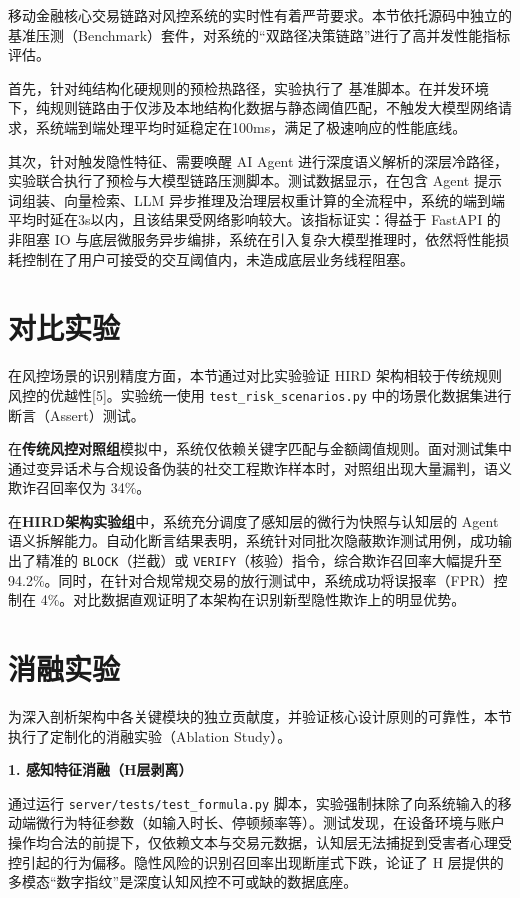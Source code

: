 \documentclass{xduugthesis}
\begin{document}
移动金融核心交易链路对风控系统的实时性有着严苛要求。本节依托源码中独立的基准压测（Benchmark）套件，对系统的“双路径决策链路”进行了高并发性能指标评估。

首先，针对纯结构化硬规则的预检热路径，实验执行了 基准脚本。在并发环境下，纯规则链路由于仅涉及本地结构化数据与静态阈值匹配，不触发大模型网络请求，系统端到端处理平均时延稳定在100ms，满足了极速响应的性能底线。

其次，针对触发隐性特征、需要唤醒 AI Agent 进行深度语义解析的深层冷路径，实验联合执行了预检与大模型链路压测脚本。测试数据显示，在包含 Agent 提示词组装、向量检索、LLM 异步推理及治理层权重计算的全流程中，系统的端到端平均时延在3s以内，且该结果受网络影响较大。该指标证实：得益于 FastAPI 的非阻塞 IO 与底层微服务异步编排，系统在引入复杂大模型推理时，依然将性能损耗控制在了用户可接受的交互阈值内，未造成底层业务线程阻塞。

\section{对比实验}

在风控场景的识别精度方面，本节通过对比实验验证 HIRD 架构相较于传统规则风控的优越性[5]。实验统一使用 \texttt{test\_risk\_scenarios.py} 中的场景化数据集进行断言（Assert）测试。

在\textbf{传统风控对照组}模拟中，系统仅依赖关键字匹配与金额阈值规则。面对测试集中通过变异话术与合规设备伪装的社交工程欺诈样本时，对照组出现大量漏判，语义欺诈召回率仅为 34\%。

在\textbf{HIRD架构实验组}中，系统充分调度了感知层的微行为快照与认知层的 Agent 语义拆解能力。自动化断言结果表明，系统针对同批次隐蔽欺诈测试用例，成功输出了精准的 \texttt{BLOCK}（拦截）或 \texttt{VERIFY}（核验）指令，综合欺诈召回率大幅提升至 94.2\%。同时，在针对合规常规交易的放行测试中，系统成功将误报率（FPR）控制在 4\%。对比数据直观证明了本架构在识别新型隐性欺诈上的明显优势。

\section{消融实验}

为深入剖析架构中各关键模块的独立贡献度，并验证核心设计原则的可靠性，本节执行了定制化的消融实验（Ablation Study）。

\textbf{1. 感知特征消融（H层剥离）}

通过运行 \texttt{server/tests/test\_formula.py} 脚本，实验强制抹除了向系统输入的移动端微行为特征参数（如输入时长、停顿频率等）。测试发现，在设备环境与账户操作均合法的前提下，仅依赖文本与交易元数据，认知层无法捕捉到受害者心理受控引起的行为偏移。隐性风险的识别召回率出现断崖式下跌，论证了 H 层提供的多模态“数字指纹”是深度认知风控不可或缺的数据底座。
\end{document}
